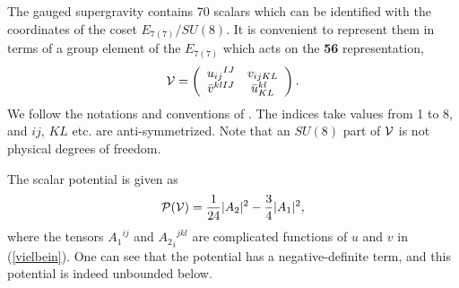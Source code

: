 \documentclass[a4paper,a4paper]{article}
\begin{document}
\vspace{3mm}

The gauged supergravity contains 70 scalars which can be identified with the coordinates of the coset 
$E_{7(7)}/SU(8)$. 
It is convenient to represent them in terms of a group element of the $E_{7(7)}$ which acts on the {\bf 56} 
representation, 
\begin{equation}
{\cal V} = \left(
\begin{array}{cc}
{u_{ij}}^{IJ} & v_{ijKL} \\ \bar{v}^{klIJ} & {\bar{u}^{kl}}_{KL}
    \label{vielbein}
\end{array}
\right).
\end{equation}
We follow the notations and conventions of \cite{notation}. 
The indices take values from 1 to 8, and $ij$, $KL$ etc. are anti-symmetrized. 
Note that an $SU(8)$ part of ${\cal V}$ is not physical degrees of freedom. 

The scalar potential is given as 
\begin{equation}
{\cal P(V)} = \frac1{24}|A_2|^2-\frac34|A_1|^2,
   \label{P(V)}
\end{equation}
where the tensors ${A_1}^{ij}$ and ${{A_2}_i}^{jkl}$ are complicated functions of $u$ and $v$ in 
(\ref{vielbein}). 
One can see that the potential has a negative-definite term, and this potential is indeed unbounded below. 
\end{document}
